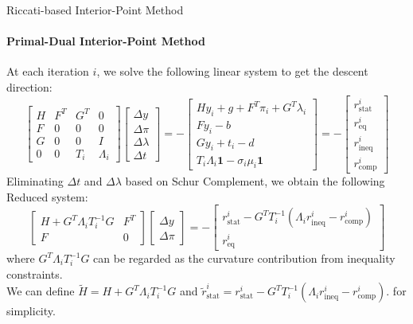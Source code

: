 \documentclass[10pt,aspectratio=1610]{beamer} %
\begin{document}
\begin{frame}{Riccati-based Interior-Point Method}
    \framesubtitle{Primal-Dual Interior-Point Method}
	At each iteration $i$, we solve the following linear system to get the descent direction:
	\begin{equation}
		\begin{bmatrix}
		H & F^T & G^T & 0\\
		F & 0 & 0 & 0 \\
		G & 0 & 0 & I \\
		0 & 0 & T_i & \Lambda_i
		\end{bmatrix}
		\begin{bmatrix}
		\Delta y \\
		\Delta \pi \\
        \Delta \lambda \\
		\Delta t
		\end{bmatrix} = -
		\begin{bmatrix}
            Hy_i + g + F^T \pi_i + G^T \lambda_i \\
            Fy_i - b \\
            Gy_i + t_i - d \\
            T_i \Lambda_i \mathbf{1} - \sigma_i \mu_i \mathbf{1}
        \end{bmatrix} = -
		\begin{bmatrix}
		r_{\mathrm{stat}}^i \\
		r_{\mathrm{eq}}^i \\
		r_{\mathrm{ineq}}^i \\
		r_{\mathrm{comp}}^i
		\end{bmatrix}
	\end{equation}
    \pause
	Eliminating $\Delta t$ and $\Delta \lambda$ based on Schur Complement, we obtain the following Reduced system:
	\begin{equation}
		\begin{bmatrix}
		 H + G^T \Lambda_i T_i^{-1} G & F^T \\
		F & 0
		\end{bmatrix}
		\begin{bmatrix}
		\Delta y \\
		\Delta \pi
		\end{bmatrix} = -
		\begin{bmatrix}
		r_{\mathrm{stat}}^i - G^T T_i^{-1} ( \Lambda_i r_{\mathrm{ineq}}^i - r_{\mathrm{comp}}^i ) \\
		r_{\mathrm{eq}}^i
		\end{bmatrix}
	\end{equation}
    where $G^T \Lambda_i T_i^{-1} G$ can be regarded as the curvature contribution from inequality constraints.\\
    \vspace{0.5em}
    We can define $\tilde{H} = H + G^T \Lambda_i T_i^{-1} G$ and $\tilde{r}_{\mathrm{stat}}^i = r_{\mathrm{stat}}^i - G^T T_i^{-1} ( \Lambda_i r_{\mathrm{ineq}}^i - r_{\mathrm{comp}}^i )$. for simplicity.
\end{frame}
\end{document}
